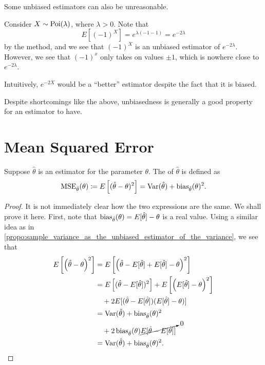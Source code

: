 \documentclass[notoc,notitlepage]{tufte-book}
\begin{document}
Some unbiased estimators can also be unreasonable.

\begin{eg}
  Consider $X \sim \operatorname{Poi}(\lambda)$, where $\lambda > 0$. Note that
  \begin{equation*}
    E[(-1)^X] = e^{\lambda(-1-1)} = e^{-2\lambda}
  \end{equation*}
  by the  method, and we see that
  $(-1)^X$ is an unbiased estimator of $e^{-2\lambda}$. However, we see that
  $(-1)^x$ only takes on values $\pm 1$, which is nowhere close to
  $e^{-2\lambda}$.

  Intuitively, $e^{-2 \overline{X}}$ would be a ``better'' estimator despite the
  fact that it is biased.
\end{eg}

Despite shortcomings like the above, unbiasedness is generally a good property
for an estimator to have.


\section{Mean Squared Error}%
\label{sec:mean_squared_error}

\begin{defn}\label{defn:mean_squared_error}
  Suppose $\hat{\theta}$ is an estimator for the parameter $\theta$. The
   of $\hat{\theta}$ is defined as
  \begin{equation*}
    \operatorname{MSE}_{\hat{\theta}}(\theta) \coloneqq E \left[ (\hat{\theta} - \theta)^2
    \right] = \operatorname{Var}(\hat{\theta}) + \operatorname{bias}_{\hat{\theta}}(\theta)^2.
  \end{equation*}
\end{defn}

\begin{proof}
  It is not immediately clear how the two expressions are the same. We shall
  prove it here. First, note that $\operatorname{bias}_{\hat{\theta}}(\theta) =
  E[\hat{\theta}] - \theta$ is a real value. Using a similar idea as in
  \cref{propo:sample_variance_as_the_unbiased_estimator_of_the_variance}, we see
  that
  \begin{align*}
    E \left[ \left(\hat{\theta} - \theta\right)^2 \right]
    &= E \left[ \left( \hat{\theta} - E[\hat{\theta}] + E[\hat{\theta}] - \theta
    \right)^2 \right] \\
    &= E\left[(\hat{\theta} - E[\hat{\theta}])^2\right] + E\left[\left(
      E[\hat{\theta}] - \theta \right)^2\right] \\
    &\quad + 2E[(\hat{\theta} - E[\hat{\theta}])(E[\hat{\theta}]-\theta)] \\
    &= \operatorname{Var}(\hat{\theta}) + \operatorname{bias}_{\hat{\theta}}(\theta)^2 \\
    &\quad + 2\operatorname{bias}_{\hat{\theta}}(\theta)\cancelto{0}{E[\hat{\theta} -
      E[\hat{\theta}]]} \\
    &= \operatorname{Var}(\hat{\theta}) + \operatorname{bias}_{\hat{\theta}}(\theta)^2.
  \end{align*}
\end{proof}
\end{document}
